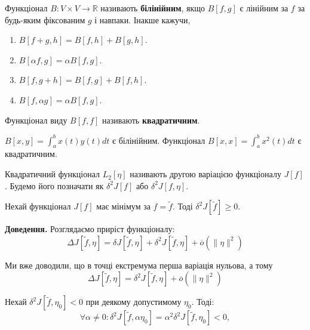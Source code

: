 \documentclass[14pt]{extarticle}
\newcommand{\<}{\langle}
\renewcommand{\>}{\rangle}
\theoremstyle{mystyle}{\newtheorem{definition}{Definition}[section]}
\theoremstyle{mystyle}{\newtheorem{proposition}[definition]{Proposition}}
\theoremstyle{mystyle}{\newtheorem{theorem}[definition]{Theorem}}
\theoremstyle{mystyle}{\newtheorem{lemma}[definition]{Lemma}}
\theoremstyle{mystyle}{\newtheorem{corollary}[definition]{Corollary}}
\theoremstyle{mystyle}{\newtheorem*{remark}{Remark}}
\theoremstyle{mystyle}{\newtheorem*{remarks}{Remarks}}
\theoremstyle{mystyle}{\newtheorem*{example}{Example}}
\theoremstyle{mystyle}{\newtheorem*{examples}{Examples}}
\theoremstyle{definition}{\newtheorem*{exercise}{Exercise}}
\theoremstyle{cstyle}{\newtheorem*{cthm}{}}
\theoremstyle{warn}
\begin{document}
\begin{definition}
    Функціонал $B: V \times V \to \mathbb{R}$ називають \textbf{білінійним}, якщо $B[f,g]$ є лінійним за $f$ за будь-яким фіксованим $g$ і навпаки. Інакше кажучи,
    \begin{enumerate}
        \item $B[f+g,h] = B[f,h]+B[g,h]$.
        \item $B[\alpha f,g] = \alpha B[f,g]$.
        \item $B[f,g+h]=B[f,g]+B[f,h]$.
        \item $B[f,\alpha g]=\alpha B[f,g]$.
    \end{enumerate}
\end{definition}

\begin{definition}
    Функціонал виду $B[f,f]$ називають \textbf{квадратичним}.
\end{definition}

\begin{example}
    $B[x,y]=\int_a^b x(t)y(t)dt$ є білінійним. Функціонал $B[x,x]=\int_a^b x^2(t)dt$ є квадратичним.
\end{example}

\begin{definition}
    Квадратичний функціонал $L_2[\eta]$ називають другою варіацією функціоналу $J[f]$. Будемо його позначати як $\delta^2J[f]$ або $\delta^2 J[f,\eta]$.
\end{definition}

\begin{theorem}
    Нехай функціонал $J[f]$ має мінімум за $f=\widetilde{f}$. Тоді $\delta^2 J[\widetilde{f}] \geq 0$.
\end{theorem}

\textbf{Доведення.} Розглядаємо приріст функціоналу:
\begin{equation}
    \Delta J[\widetilde{f}, \eta] = \delta J[\widetilde{f},\eta] + \delta^2 J[\widetilde{f},\eta] + \overline{o}(\|\eta\|^2)
\end{equation}

Ми вже доводили, що в точці екстремума перша варіація нульова, а тому 
\begin{equation}
    \Delta J[\widetilde{f}, \eta] = \delta^2 J[\widetilde{f},\eta] + \overline{o}(\|\eta\|^2)
\end{equation}

Нехай $\delta^2J[\widetilde{f},\eta_0]<0$ при деякому допустимому $\eta_0$. Тоді:
\begin{equation}
    \forall \alpha \neq 0: \delta^2 J[\widetilde{f},\alpha \eta_0] = \alpha^2\delta^2 J[\widetilde{f},\eta_0] < 0,
\end{equation}
\end{document}
